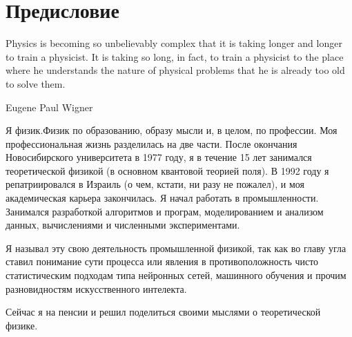 \chapter{Предисловие}

\epigraph{Physics is becoming so unbelievably complex that it is taking longer
and longer to train a physicist. It is taking so long, in fact, to train a 
physicist to the place where he understands the nature of physical problems that 
he is already too old to solve them.}{Eugene Paul Wigner}

Я физик.Физик по образованию, образу мысли и, в целом, по профессии.
 Моя профессиональная жизнь разделилась на две части. После окончания Новосибирского 
университета в 1977 году, я в течение 15 лет занимался теоретической физикой 
(в основном квантовой теорией поля). В 1992 году я репатриировался в Израиль  
(о чем, кстати, ни разу не пожалел), и моя академическая карьера закончилась.
Я начал работать в промышленности. Занимался разработкой алгоритмов и програм, 
моделированием и анализом данных, вычислениями и численными экспериментами.

Я называл эту свою деятельность промышленной физикой, так как во главу угла
ставил понимание сути процесса или явления в противоположность чисто статистическим
подходам типа нейронных сетей, машинного обучения и прочим разновидностям
искусственного интелекта.

 Сейчас я на пенсии и решил поделиться своими мыслями о теоретической физике.

